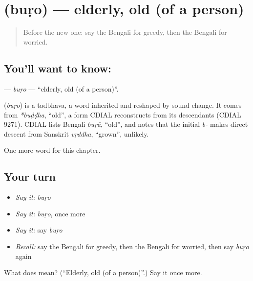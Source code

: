 \section[\texorpdfstring{\bn{বুড়ো} (buṛo)}{বুড়ো (buṛo)}]{ (buṛo) — elderly, old (of a person)}

\label{lesson:BN-C160-buro}



\begin{quote}
Before the new one: say the Bengali for greedy, then the Bengali for worried.
\end{quote}

\subsection*{You'll want to know: }
\textbf{} — \emph{buṛo} — \textquotedblleft{}elderly, old (of a person)\textquotedblright{}.

\begin{cousinweb}
\textbf{} (\emph{buṛo}) is a tadbhava, a word inherited and reshaped by sound change. It comes from \emph{*buḍḍha}, \textquotedblleft{}old\textquotedblright{}, a form CDIAL reconstructs from its descendants (CDIAL 9271). CDIAL lists Bengali \emph{buṛā}, \textquotedblleft{}old\textquotedblright{}, and notes that the initial \emph{b-} makes direct descent from Sanskrit \emph{vṛddha}, \textquotedblleft{}grown\textquotedblright{}, unlikely.
\end{cousinweb}

\begin{grammarlens}[title={What you've built}]
One more word for this chapter.
\end{grammarlens}

\subsection*{Your turn}
\begin{itemize}
\raggedright
  \item \emph{Say it:} \emph{buṛo}
  \item \emph{Say it:} \emph{buṛo}, once more
  \item \emph{Say it:} say \emph{buṛo}
  \item \emph{Recall:} say the Bengali for greedy, then the Bengali for worried, then say \emph{buṛo} again
\end{itemize}

\begin{tcolorbox}[breakable,colback=teal!4,colframe=teal!35!black,title={Before you move on}]
What does  mean? (\textquotedblleft{}Elderly, old (of a person)\textquotedblright{}.) Say it once more.
\end{tcolorbox}
